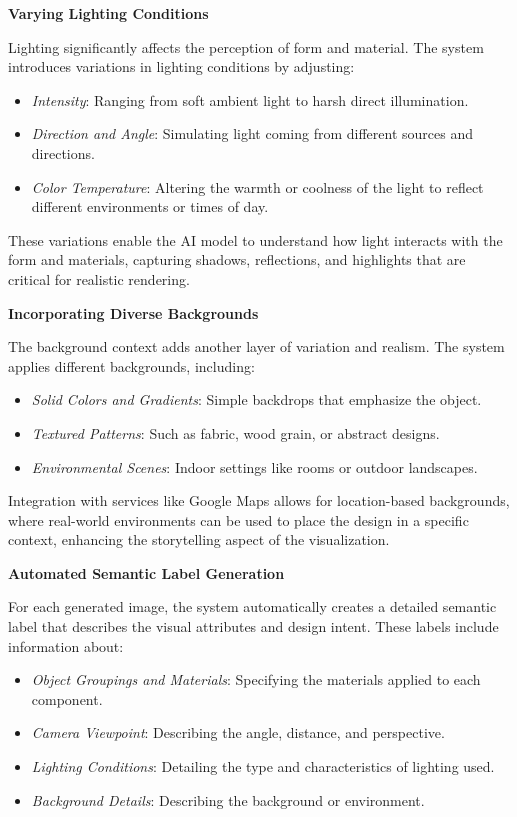 \documentclass{article}
\begin{document}
\textbf{Varying Lighting Conditions}

Lighting significantly affects the perception of form and material. The system introduces variations in lighting conditions by adjusting:

\begin{itemize}
    \item \textit{Intensity}: Ranging from soft ambient light to harsh direct illumination.
    \item \textit{Direction and Angle}: Simulating light coming from different sources and directions.
    \item \textit{Color Temperature}: Altering the warmth or coolness of the light to reflect different environments or times of day.
\end{itemize}

These variations enable the AI model to understand how light interacts with the form and materials, capturing shadows, reflections, and highlights that are critical for realistic rendering.

\textbf{Incorporating Diverse Backgrounds}

The background context adds another layer of variation and realism. The system applies different backgrounds, including:

\begin{itemize}
    \item \textit{Solid Colors and Gradients}: Simple backdrops that emphasize the object.
    \item \textit{Textured Patterns}: Such as fabric, wood grain, or abstract designs.
    \item \textit{Environmental Scenes}: Indoor settings like rooms or outdoor landscapes.
\end{itemize}

Integration with services like Google Maps allows for location-based backgrounds, where real-world environments can be used to place the design in a specific context, enhancing the storytelling aspect of the visualization.

\textbf{Automated Semantic Label Generation}

For each generated image, the system automatically creates a detailed semantic label that describes the visual attributes and design intent. These labels include information about:

\begin{itemize}
    \item \textit{Object Groupings and Materials}: Specifying the materials applied to each component.
    \item \textit{Camera Viewpoint}: Describing the angle, distance, and perspective.
    \item \textit{Lighting Conditions}: Detailing the type and characteristics of lighting used.
    \item \textit{Background Details}: Describing the background or environment.
\end{itemize}
\end{document}
